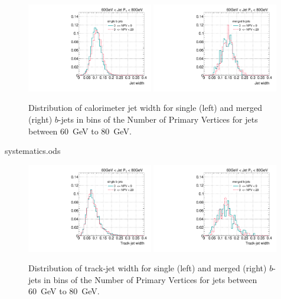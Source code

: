 \begin{figure}[tp]
\centering
\includegraphics[width=0.49\textwidth]{FIGS/systematics/Widthsingle_060.pdf}
\includegraphics[width=0.49\textwidth]{FIGS/systematics/Widthmerged_060.pdf}
\caption{Distribution of calorimeter jet width for single (left) and merged (right) $b$-jets in bins of the Number of Primary Vertices for jets between 60~GeV to 80~GeV.}
\label{fig:calowidthpileup}
\end{figure}
systematics.ods

\begin{figure}[tp]
\centering
\includegraphics[width=0.49\textwidth]{FIGS/systematics/trkWidthsingle_060.pdf}
\includegraphics[width=0.49\textwidth]{FIGS/systematics/trkWidthmerged_060.pdf}
\caption{Distribution of track-jet width for single (left) and merged (right) $b$-jets in bins of the Number of Primary Vertices for jets between 60~GeV to 80~GeV.}
\label{fig:trkwidthpileup}
\end{figure}



